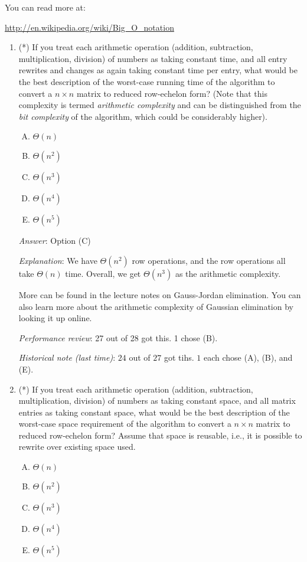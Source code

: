 \documentclass[10pt]{amsart}
\begin{document}
You can read more at:

\url{http://en.wikipedia.org/wiki/Big_O_notation}

\begin{enumerate}
\item (*) If you treat each arithmetic operation (addition,
  subtraction, multiplication, division) of numbers as taking constant
  time, and all entry rewrites and changes as again taking constant
  time per entry, what would be the best description of the worst-case
  running time of the algorithm to convert a $n \times n$ matrix to
  reduced row-echelon form? (Note that this complexity is termed {\em
    arithmetic complexity} and can be distinguished from the {\em bit
    complexity} of the algorithm, which could be considerably
  higher).

  \begin{enumerate}[(A)]
  \item $\Theta(n)$
  \item $\Theta(n^2)$
  \item $\Theta(n^3)$
  \item $\Theta(n^4)$
  \item $\Theta(n^5)$
  \end{enumerate}

  {\em Answer}: Option (C)

  {\em Explanation}: We have $\Theta(n^2)$ row operations, and the row
  operations all take $\Theta(n)$ time. Overall, we get $\Theta(n^3)$
  as the arithmetic complexity.

  More can be found in the lecture notes on Gauss-Jordan
  elimination. You can also learn more about the arithmetic complexity
  of Gaussian elimination by looking it up online.

  {\em Performance review}: 27 out of 28 got this. 1 chose (B).

  {\em Historical note (last time)}: $24$ out of $27$ got tihs. $1$ each chose
  (A), (B), and (E).

\item (*) If you treat each arithmetic operation (addition,
  subtraction, multiplication, division) of numbers as taking constant
  space, and all matrix entries as taking constant space, what would
  be the best description of the worst-case space requirement of the
  algorithm to convert a $n \times n$ matrix to reduced row-echelon
  form? Assume that space is reusable, i.e., it is possible to rewrite
  over existing space used.

  \begin{enumerate}[(A)]
  \item $\Theta(n)$
  \item $\Theta(n^2)$
  \item $\Theta(n^3)$
  \item $\Theta(n^4)$
  \item $\Theta(n^5)$
  \end{enumerate}


\end{enumerate}
\end{document}
